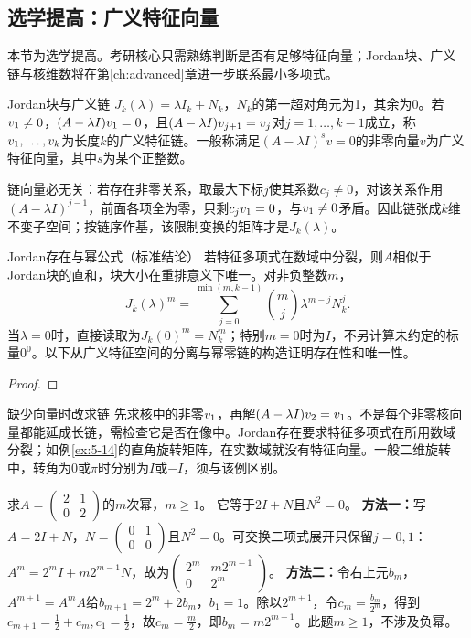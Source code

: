 \subsection{选学提高：广义特征向量}
\begin{extension}
本节为选学提高。考研核心只需熟练判断是否有足够特征向量；Jordan块、广义链与核维数将在第\ref{ch:advanced}章进一步联系最小多项式。
\end{extension}
\begin{definition}{Jordan块与广义链}
$J_k(\lambda)=\lambda I_k+N_k$，$N_k$的第一超对角元为1，其余为0。若$v_1\ne0$，$(A-\lambda I)v_1=0$，且$(A-\lambda I)v_{j+1}=v_j$对$j=1,\ldots,k-1$成立，称$v_1,\ldots,v_k$为长度$k$的广义特征链。一般称满足$(A-\lambda I)^s v=0$的非零向量$v$为广义特征向量，其中$s$为某个正整数。

链向量必无关：若存在非零关系，取最大下标$j$使其系数$c_j\ne0$，对该关系作用$(A-\lambda I)^{j-1}$，前面各项全为零，只剩$c_jv_1=0$，与$v_1\ne0$矛盾。因此链张成$k$维不变子空间；按链序作基，该限制变换的矩阵才是$J_k(\lambda)$。
\end{definition}
\begin{theorem}{Jordan存在与幂公式（标准结论）}
若特征多项式在数域中分裂，则$A$相似于Jordan块的直和，块大小在重排意义下唯一。对非负整数$m$，
\begin{equation}J_k(\lambda)^m=\sum_{j=0}^{\min(m,k-1)}\binom mj\lambda^{m-j}N_k^j.\label{eq:jpower}\end{equation}
当$\lambda=0$时，直接读取为$J_k(0)^m=N_k^m$；特别$m=0$时为$I$，不另计算未约定的标量$0^0$。以下从广义特征空间的分离与幂零链的构造证明存在性和唯一性。
\end{theorem}
\begin{proof}

\end{proof}
\begin{method}{缺少向量时改求链}
先求核中的非零$v_1$，再解$(A-\lambda I)v_2=v_1$。不是每个非零核向量都能延成长链，需检查它是否在像中。Jordan存在要求特征多项式在所用数域分裂；如例\ref{ex:5-14}的直角旋转矩阵，在实数域就没有特征向量。一般二维旋转中，转角为$0$或$\pi$时分别为$I$或$-I$，须与该例区别。
\end{method}
{求$A=\begin{pmatrix}2&1\\0&2\end{pmatrix}$的$m$次幂，$m\ge1$。}
{它等于$2I+N$且$N^2=0$。}
{\textbf{方法一：}写$A=2I+N$，$N=\begin{pmatrix}0&1\\0&0\end{pmatrix}$且$N^2=0$。可交换二项式展开只保留$j=0,1$：$A^m=2^mI+m2^{m-1}N$，故为$\begin{pmatrix}2^m&m2^{m-1}\\0&2^m\end{pmatrix}$。
\textbf{方法二：}令右上元$b_m$，$A^{m+1}=A^mA$给$b_{m+1}=2^m+2b_m$，$b_1=1$。除以$2^{m+1}$，令$c_m=\frac{b_m}{2^m}$，得到$c_{m+1}=\frac{1}{2}+c_m,c_1=\frac{1}{2}$，故$c_m=\frac{m}{2}$，即$b_m=m2^{m-1}$。此题$m\ge1$，不涉及负幂。}
